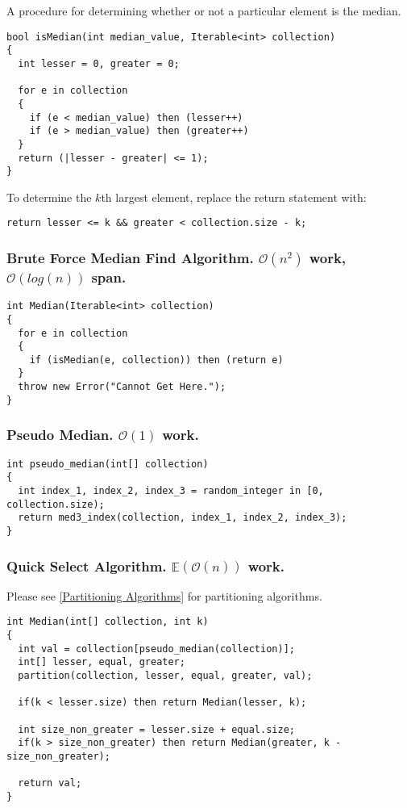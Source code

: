 \documentclass[12pt, letterpaper]{book}
\newcommand{\bigO}{\mathcal{O}}
\begin{document}
A procedure for determining whether or not a particular element is the median.

\begin{verbatim}
bool isMedian(int median_value, Iterable<int> collection)
{
  int lesser = 0, greater = 0;

  for e in collection
  {
    if (e < median_value) then (lesser++)
    if (e > median_value) then (greater++)
  }
  return (|lesser - greater| <= 1);
}
\end{verbatim}

To determine the $k$th largest element, replace the return statement with:
\begin{verbatim}
return lesser <= k && greater < collection.size - k;
\end{verbatim}

		\subsubsection{Brute Force Median Find Algorithm. $\bigO(n^{2})$ work, $\bigO(log(n))$ span.}

\begin{verbatim}
int Median(Iterable<int> collection)
{
  for e in collection
  {
    if (isMedian(e, collection)) then (return e)
  }
  throw new Error("Cannot Get Here.");
}
\end{verbatim}

\newpage

		\subsubsection{Pseudo Median. $\bigO(1)$ work.}

\begin{verbatim}
int pseudo_median(int[] collection)
{
  int index_1, index_2, index_3 = random_integer in [0, collection.size);
  return med3_index(collection, index_1, index_2, index_3);
}
\end{verbatim}

		\subsubsection{Quick Select Algorithm. $\mathbb{E}(\bigO(n))$ work. }

Please see \ref{Partitioning Algorithms} for partitioning algorithms.

\begin{verbatim}
int Median(int[] collection, int k)
{
  int val = collection[pseudo_median(collection)];
  int[] lesser, equal, greater;
  partition(collection, lesser, equal, greater, val);

  if(k < lesser.size) then return Median(lesser, k);

  int size_non_greater = lesser.size + equal.size;
  if(k > size_non_greater) then return Median(greater, k - size_non_greater);

  return val;
}
\end{verbatim}
\end{document}

